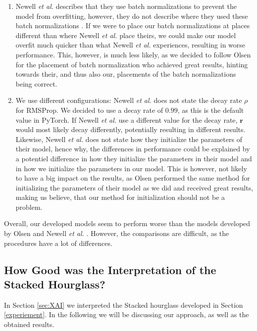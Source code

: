 \documentclass[./main.tex]{subfiles}
\begin{document}
\begin{enumerate}
    \item Newell \textit{et al.} describes that they use batch normalizations to prevent the model from overfitting, however, they do not describe where they used these batch normalizations \cite{Newell}. If we were to place our batch normalizations at places different than where Newell \textit{et al.} \cite{Newell} place theirs, we could make our model overfit much quicker than what Newell \textit{et al.} \cite{Newell} experiences, resulting in worse performance. This, however, is much less likely, as we decided to follow Olsen \cite{Camilla} for the placement of batch normalization who achieved great results, hinting towards their, and thus also our, placements of the batch normalizations being correct.
    \item We use different configurations: Newell \textit{et al.} \cite{Newell} does not state the decay rate $\rho$ for RMSProp. We decided to use a decay rate of $0.99$, as this is the default value in PyTorch. If Newell \textit{et al.} \cite{Newell} use a different value for the decay rate, $\bm{r}$ would most likely decay differently, potentially resulting in different results. Likewise, Newell \textit{et al.} \cite{Newell} does not state how they initialize the parameters of their model, hence why, the differences in performance could be explained by a potentiel difference in how they initialize the parameters in their model and in how we initialize the parameters in our model. This is however, not likely to have a big impact on the results, as Olsen \cite{Camilla} performed the same method for initializing the parameters of their model as we did and received great results, making us believe, that our method for initialization should not be a problem.
\end{enumerate}
Overall, our developed models seem to perform worse than the models developed by Olsen \cite{Camilla} and Newell \textit{et al.} \cite{Newell}. However, the comparisons are difficult, as the procedures have a lot of differences.

\subsection{How Good was the Interpretation of the Stacked Hourglass?}\label{subsec:XAI_disc}
In Section \ref{sec:XAI} we interpreted the Stacked hourglass developed in Section \ref{experiement}. In the following we will be discussing our approach, as well as the obtained results.
\end{document}
